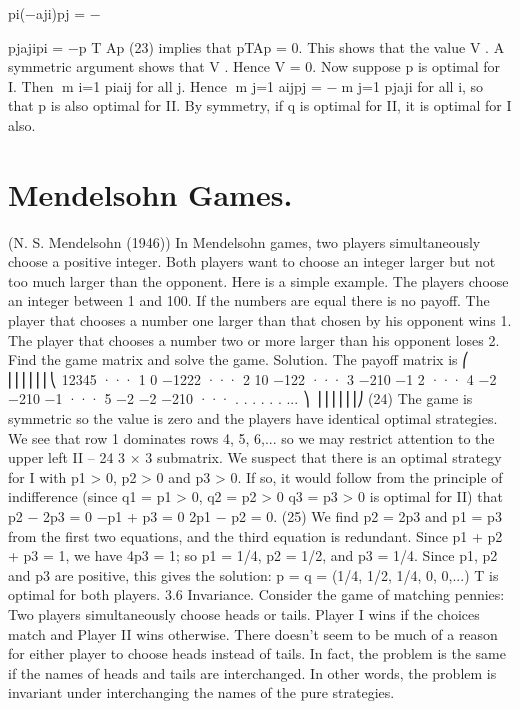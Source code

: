 pi(−aji)pj = −


pjajipi = −p
T
Ap (23)
implies that pTAp = 0. This shows that the value V . A symmetric argument shows
that V . Hence V = 0. Now suppose p is optimal for I. Then m
i=1 piaij  for all
j. Hence m
j=1 aijpj = −m
j=1 pjaji  for all i, so that p is also optimal for II. By
symmetry, if q is optimal for II, it is optimal for I also.
\section{Mendelsohn Games.}
 (N. S. Mendelsohn (1946)) In Mendelsohn games, two players
simultaneously choose a positive integer. Both players want to choose an integer larger
but not too much larger than the opponent. Here is a simple example. The players choose
an integer between 1 and 100. If the numbers are equal there is no payoff. The player that
chooses a number one larger than that chosen by his opponent wins 1. The player that
chooses a number two or more larger than his opponent loses 2. Find the game matrix
and solve the game.
Solution. The payoff matrix is
⎛
⎜⎜⎜⎜⎜⎜⎝
12345 ···
1 0 −1222 ···
2 10 −122 ···
3 −210 −1 2 ···
4 −2 −210 −1 ···
5 −2 −2 −210 ··· .
.
. .
.
. ...
⎞
⎟⎟⎟⎟⎟⎟⎠
(24)
The game is symmetric so the value is zero and the players have identical optimal strategies.
We see that row 1 dominates rows 4, 5, 6,... so we may restrict attention to the upper left
II – 24
3 × 3 submatrix. We suspect that there is an optimal strategy for I with p1 > 0, p2 > 0
and p3 > 0. If so, it would follow from the principle of indifference (since q1 = p1 > 0,
q2 = p2 > 0 q3 = p3 > 0 is optimal for II) that
p2 − 2p3 = 0
−p1 + p3 = 0
2p1 − p2 = 0. (25)
We find p2 = 2p3 and p1 = p3 from the first two equations, and the third equation is
redundant. Since p1 + p2 + p3 = 1, we have 4p3 = 1; so p1 = 1/4, p2 = 1/2, and p3 = 1/4.
Since p1, p2 and p3 are positive, this gives the solution: p = q = (1/4, 1/2, 1/4, 0, 0,...)
T is
optimal for both players.
3.6 Invariance. Consider the game of matching pennies: Two players simultaneously
choose heads or tails. Player I wins if the choices match and Player II wins otherwise.
There doesn’t seem to be much of a reason for either player to choose heads instead of
tails. In fact, the problem is the same if the names of heads and tails are interchanged. In
other words, the problem is invariant under interchanging the names of the pure strategies.

